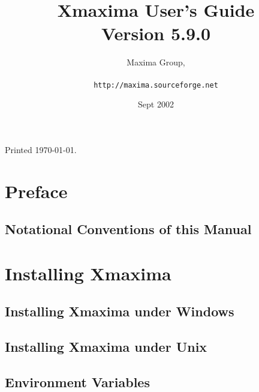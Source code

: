 \documentclass[12pt,makeidx,maxima]{report}
\begin{document}
\title{Xmaxima User's Guide\\
	Version 5.9.0}

\author{Maxima Group,\\
        \ \\
	{\tt http://maxima.sourceforge.net}
        }

\date{Sept 2002}

\maketitle

\pagestyle{empty}
\clearpage
\vspace*{5in}
Printed \today.
\clearpage

\pagestyle{headings}
\tableofcontents
\clearpage

\clearpage
\chapter*{Preface}


\section*{Notational Conventions of this Manual}


\chapter{Installing Xmaxima}

\clearpage
\section{Installing Xmaxima under Windows}

\clearpage
\section{Installing Xmaxima under Unix}

\clearpage
\section{Environment Variables}

\clearpage
\end{document}
